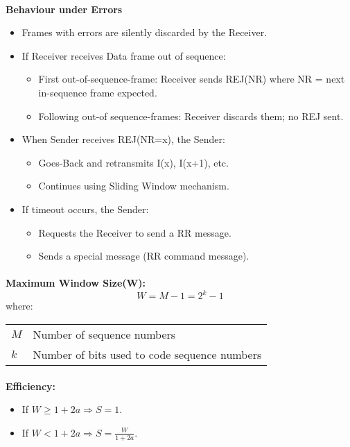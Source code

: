 \documentclass[../resumosRCOM.tex]{subfiles}
\makeatletter
\newenvironment{conditions}
  {\par\vspace{\abovedisplayskip}\noindent\begin{tabular}{>{$}l<{$} @{${}={}$} l}}
  {\end{tabular}\par\vspace{\belowdisplayskip}}
\makeatother
\begin{document}
\paragraph{}
\textbf{Behaviour under Errors}
\begin{itemize}
    \item Frames with errors are silently discarded by the Receiver.
    \item If Receiver receives Data frame out of sequence:
    \begin{itemize}
        \item First out-of-sequence-frame: Receiver sends REJ(NR) where NR =
        next in-sequence frame expected.
        \item Following out-of sequence-frames: Receiver discards them; no REJ
        sent.                
    \end{itemize}
    \item When Sender receives REJ(NR=x), the Sender:
    \begin{itemize}
        \item Goes-Back and retransmits I(x), I(x+1), etc.
        \item Continues using Sliding Window mechanism.
    \end{itemize}
    \item If timeout occurs, the Sender:
    \begin{itemize}
        \item Requests the Receiver to send a RR message.
        \item Sends a special message (RR command message).
    \end{itemize}
\end{itemize}


\paragraph{}
\textbf{Maximum Window Size(W):} 
\begin{equation}
    {W}= {M - 1} = {2^{k} - 1}
\end{equation}
where:
\begin{conditions}
    M & Number of sequence numbers\\
    k & Number of bits used to code sequence numbers \\
\end{conditions}

\paragraph{}
\textbf{Efficiency:}
\begin{itemize}
    \item If $W \geq 1 + 2a \Rightarrow S = 1$.
    \item If $W < 1 + 2a \Rightarrow S = \frac{W}{1 + 2a}$.
\end{itemize}
\end{document}
